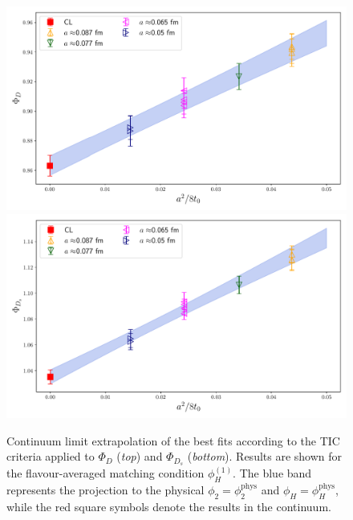 \begin{figure}
	\centering
	\includegraphics[scale=0.5]{./cap6/figs/fds/fit_cl_fD_fl_ave.pdf}
	\includegraphics[scale=0.5]{./cap6/figs/fds/fit_cl_fDs_fl_ave.pdf}
	\caption{Continuum limit extrapolation of the best fits according to the TIC criteria applied to  $\Phi_D$ (\textit{top}) and $\Phi_{D_s}$ (\textit{bottom}).  Results are shown for the flavour-averaged matching condition $\phi_H^{(1)}$. The blue band represents the projection to the physical $\phi_2 = \phi_2^{\mathrm{phys}}$ and $\phi_H = \phi_H^{\mathrm{phys}}$, while the red square symbols denote the results in the continuum.}
	\label{fig:continuum_fits_fds}
\end{figure}

